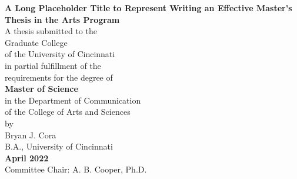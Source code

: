 \begin{titlepage}
    \begin{center}
        \pagestyle{empty}
        {\large\textbf{A Long Placeholder Title to Represent Writing an Effective Master's Thesis in the Arts Program}}\\[1.25in]

        A thesis submitted to the\\
        Graduate College\\
        of the University of Cincinnati\\
        in partial fulfillment of the\\
        requirements for the degree of\\[0.25in]

        \textbf{Master of Science}\\[0.25in]

        in the Department of Communication\\
        of the College of Arts and Sciences\\

        by\\[0.25in]
        Bryan J. Cora\\
        B.A., University of Cincinnati\\

        \textbf{April 2022}\\[1 in]

        Committee Chair: A. B. Cooper, Ph.D.
    \end{center}
\end{titlepage}

